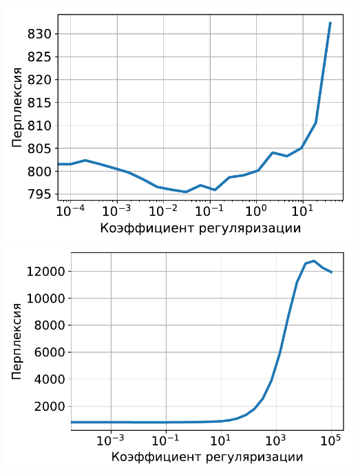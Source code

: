\documentclass[unicode]{beamer}
\begin{document}
\begin{frame}
\begin{center}
    \includegraphics[scale=0.30]{perplexity_tf_reg_on_ppmi_mmro.pdf}
    \includegraphics[scale=0.30]{perplexity_df_reg_on_ppmi_mmro_full.pdf}
\end{center}
\end{frame}
\end{document}
